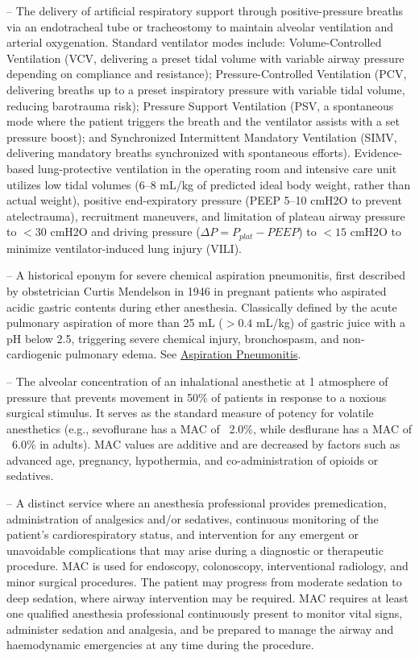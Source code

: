 -- The delivery of artificial respiratory support through positive-pressure breaths via an endotracheal tube or tracheostomy to maintain alveolar ventilation and arterial oxygenation. Standard ventilator modes include: Volume-Controlled Ventilation (VCV, delivering a preset tidal volume with variable airway pressure depending on compliance and resistance); Pressure-Controlled Ventilation (PCV, delivering breaths up to a preset inspiratory pressure with variable tidal volume, reducing barotrauma risk); Pressure Support Ventilation (PSV, a spontaneous mode where the patient triggers the breath and the ventilator assists with a set pressure boost); and Synchronized Intermittent Mandatory Ventilation (SIMV, delivering mandatory breaths synchronized with spontaneous efforts). Evidence-based lung-protective ventilation in the operating room and intensive care unit utilizes low tidal volumes (6--8 mL/kg of predicted ideal body weight, rather than actual weight), positive end-expiratory pressure (PEEP 5--10 cmH2O to prevent atelectrauma), recruitment maneuvers, and limitation of plateau airway pressure to $<30$ cmH2O and driving pressure ($\Delta P = P_{plat} - PEEP$) to $<15$ cmH2O to minimize ventilator-induced lung injury (VILI).

-- A historical eponym for severe chemical aspiration pneumonitis, first described by obstetrician Curtis Mendelson in 1946 in pregnant patients who aspirated acidic gastric contents during ether anesthesia. Classically defined by the acute pulmonary aspiration of more than 25 mL ($>0.4$ mL/kg) of gastric juice with a pH below 2.5, triggering severe chemical injury, bronchospasm, and non-cardiogenic pulmonary edema. See \hyperlink{Aspiration Pneumonitis}{Aspiration Pneumonitis}.

-- The alveolar concentration of an inhalational anesthetic at 1 atmosphere of pressure that prevents movement in 50\% of patients in response to a noxious surgical stimulus. It serves as the standard measure of potency for volatile anesthetics (e.g., sevoflurane has a MAC of ~2.0\%, while desflurane has a MAC of ~6.0\% in adults). MAC values are additive and are decreased by factors such as advanced age, pregnancy, hypothermia, and co-administration of opioids or sedatives.

-- A distinct service where an anesthesia professional provides premedication, administration of analgesics and/or sedatives, continuous monitoring of the patient's cardiorespiratory status, and intervention for any emergent or unavoidable complications that may arise during a diagnostic or therapeutic procedure. MAC is used for endoscopy, colonoscopy, interventional radiology, and minor surgical procedures. The patient may progress from moderate sedation to deep sedation, where airway intervention may be required. MAC requires at least one qualified anesthesia professional continuously present to monitor vital signs, administer sedation and analgesia, and be prepared to manage the airway and haemodynamic emergencies at any time during the procedure.

